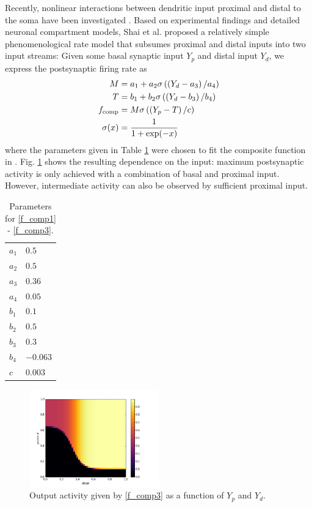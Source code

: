 \documentclass[10pt,a4paper]{article}
\begin{document}
Recently, nonlinear interactions between dendritic input proximal and distal to the soma have been investigated \cite{Shai_2015,Bono_2017}. Based on experimental findings and detailed neuronal compartment models, Shai et al. proposed a relatively simple phenomenological rate model that subsumes proximal and distal inputs into two input streams: Given some basal synaptic input $Y_p$ and distal input $Y_d$, we express the postsynaptic firing rate as
\begin{align}
M &= a_1 + a_2 \sigma \left( \left(Y_d-a_3\right) / a_4 \right) \label{f_comp1} \\ 
T &= b_1 + b_2 \sigma \left( \left(Y_d-b_3\right) / b_4 \right) \label{f_comp2}\\ 
f_{\rm comp} &= M \sigma \left(\left(Y_p - T \right) / c \right) \label{f_comp3}\\
\sigma (x) &= \frac{1}{1+\mathrm{exp}(-x)} \label{f_comp4}
\end{align}
where the parameters given in Table \ref{params_f_comp} were chosen to fit the composite function in \cite{Shai_2015}. Fig. \ref{fig:f_comp_plot} shows the resulting dependence on the input: maximum postsynaptic activity is only achieved with a combination of basal and proximal input. However, intermediate activity can also be observed by sufficient proximal input.
\begin{table}
\begin{center}
\caption{Parameters for \eqref{f_comp1} - \eqref{f_comp3}.}
\begin{tabular}{l|l}
$a_1$ & $0.5$ \\
$a_2$ & $0.5$ \\
$a_3$ & $0.36$ \\
$a_4$ & $0.05$ \\
$b_1$ & $0.1$ \\
$b_2$ & $0.5$ \\
$b_3$ & $0.3$ \\
$b_4$ & $-0.063$ \\
$c$ & $0.003$
\end{tabular}
\label{params_f_comp}
\end{center}
\end{table}

\begin{figure}
\centering
\includegraphics[width=0.5\textwidth]{../plots/f_comp.png}
\caption{\label{fig:f_comp_plot} Output activity given by \eqref{f_comp3} as a function of $Y_p$ and $Y_d$.}
\end{figure}
\end{document}
